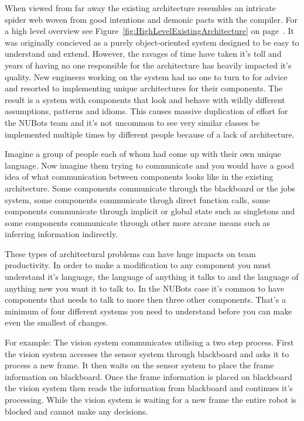 \documentclass[english,12pt]{scrartcl}
\begin{document}
            When viewed from far away the existing architecture resembles an intricate spider web
            woven from good intentions and demonic pacts with the compiler. 
            For a high level overview see Figure~\ref{fig:HighLevelExistingArchitecture} on page~\pageref{fig:HighLevelExistingArchitecture}.
            It was originally concieved as a purely object-oriented system designed to be easy to understand and extend.
            However, the ravages of time have taken it's toll and years of having no one responsible for
            the architecture has heavily impacted it's quality.
            New engineers working on the system had no one to turn to for advice and resorted to 
            implementing unique architectures for their components.
            The result is a system with components that look and behave with wildly different assumptions, patterns and
            idioms. 
            This causes massive duplication of effort for the NUBots team and it's not uncommon to see very similar classes be 
            implemented multiple times by different people because of a lack of architecture.
            
            Imagine a group of people each of whom had come up with their own unique language. 
            Now imagine them trying to communicate and you would have a good idea of what communication
            between components looks like in the existing architecture.
            Some components communicate through the blackboard or the jobs system, some components communicate throgh 
            direct function calls, some components communicate through implicit or global state such as singletons and some
            components communicate through other more arcane means such as inferring information indirectly. 

           These types of architectural problems can have huge impacts on team productivity. 
           In order to make a modification to any component you must understand it's language, the language of anything
           it talks to and the language of anything new you want it to talk to. In the NUBots case it's common to have components
           that needs to talk to more then three other components. 
           That's a minimum of four different systems you need to understand before you can make even the smallest of changes.
           
            For example: The vision system communicates utilising a two step process. 
            First the vision system accesses the sensor system through blackboard and asks it to process a new frame.
            It then waits on the sensor system to place the frame information on blackboard. 
            Once the frame information is placed on blackboard the vision system then reads the information 
            from blackboard and continues it's processing. 
            While the vision system is waiting for a new frame the entire robot is blocked and cannot make any decisions.
\end{document}

